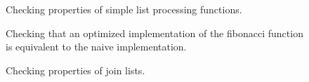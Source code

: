 



\begin{figure}
  \caption{Checking properties of simple list processing functions.}
\end{figure}

\begin{figure}
  \caption{Checking that an optimized implementation of the fibonacci
    function is equivalent to the naive implementation.}
  
\end{figure}

\begin{figure}
  \caption{Checking properties of join lists.}
\end{figure}
